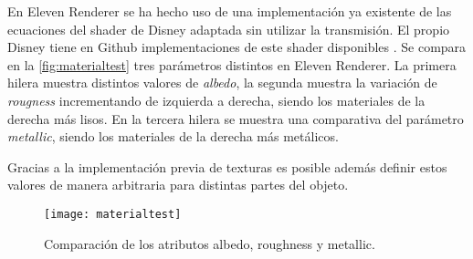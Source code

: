 En Eleven Renderer se ha hecho uso de una implementación ya existente \cite{knightcrawler25} de las ecuaciones del shader de Disney adaptada sin utilizar la transmisión. El propio Disney tiene en Github implementaciones de este shader disponibles \cite{disneyrepo}. Se compara en la \autoref{fig:materialtest} tres parámetros distintos en Eleven Renderer. La primera hilera muestra distintos valores de \emph{albedo}, la segunda muestra la variación de \emph{rougness} incrementando de izquierda a derecha, siendo los materiales de la derecha más lisos. En la tercera hilera se muestra una comparativa del parámetro \emph{metallic}, siendo los materiales de la derecha más metálicos.

Gracias a la implementación previa de texturas es posible además definir estos valores de manera arbitraria para distintas partes del objeto.

\begin{figure}[H]
	\centering
	\texttt{[image: materialtest]}
	\caption{Comparación de los atributos albedo, roughness y metallic.}
	\label{fig:materialtest}
\end{figure}
	
